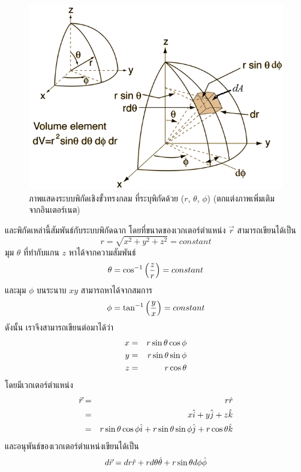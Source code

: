 \begin{figure}[!h]%
\centering
\includegraphics[width=0.75\columnwidth]{sphcoordel.png}
\caption{ภาพแสดงระบบพิกัดเชิงขั้วทรงกลม ที่ระบุพิกัดด้วย ($r$, $\theta$, $\phi$) (ตกแต่งภาพเพิ่มเติมจากอินเตอร์เนต)}
\label{fig7}
\end{figure}
และพิกัดเหล่านี้สัมพันธ์กับระบบพิกัดฉาก โดยที่ขนาดของเวกเตอร์ตำแหน่ง $\vec{r} $ สามารถเขียนได้เป็น
\begin{equation}\label{SphereCoorR}
r = \sqrt{x^2 + y^2 + z^2} = constant
\end{equation}
มุม $\theta$ ที่ทำกับแกน $z$ หาได้จากความสัมพันธ์
\begin{equation}\label{SphereCoorTheta}
\theta = \cos^{-1}\left(\frac{z}{r}\right) = constant
\end{equation}
และมุม $\phi$ บนระนาบ $xy$ สามารถหาได้จากสมการ
\begin{equation}\label{SphereCoorPhi}
\phi = \tan^{-1}\left(\frac{y}{x}\right) = constant
\end{equation}
ดังนั้น เราจึงสามารถเขียนต่อมาได้ว่า
\begin{eqnarray}\label{SphereCoorXYZ}
x &=& r \sin\theta\cos\phi \nonumber \\
y &=& r \sin\theta\sin\phi \\
z &=& r \cos\theta \nonumber
\end{eqnarray}
โดยมีเวกเตอร์ตำแหน่ง
\begin{eqnarray}\label{SphereCoorVecR}
\vec{r} &=& r\hat{r} \nonumber \\
        &=& x\hat{i} + y\hat{j} + z\hat{k} \nonumber \\
        &=& r\sin\theta\cos\phi\hat{i} + r \sin\theta\sin\phi\hat{j} + r \cos\theta\hat{k}
\end{eqnarray}
และอนุพันธ์ของเวกเตอร์ตำแหน่งเขียนได้เป็น
\begin{equation}\label{SphereCoordR}
d\vec{r} = dr\hat{r} + rd\theta\hat{\theta} + r \sin\theta d\phi\hat{\phi}
\end{equation}
